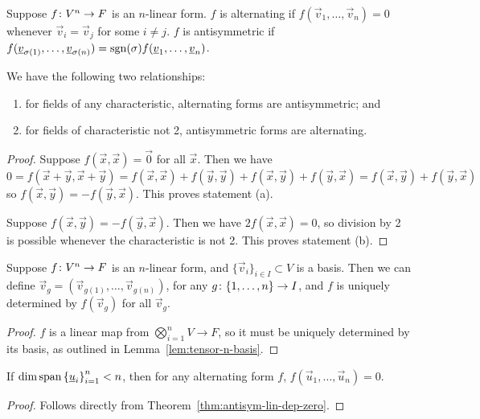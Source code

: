 \begin{definition}
    Suppose \(f\colon V^n\to F\) is an \(n\)-linear form.
    \(f\) is alternating if \(f(\vec{v}_1,\hdots,\vec{v}_n) = 0\)
    whenever \(\vec{v}_i = \vec{v}_j\) for some \(i \neq j\).
    \(f\) is antisymmetric if
    \(f(\underline{v}_{\sigma(1)},\hdots,\underline{v}_{\sigma(n)}) = \operatorname{sgn}(\sigma)f(\underline{v}_1,\hdots,\underline{v}_n)\).
\end{definition}
\begin{proposition}
    We have the following two relationships:
    \begin{enumerate}[label={(\alph*)}, itemsep=0mm]
        \item for fields of any characteristic, alternating forms are antisymmetric; and
        \item for fields of characteristic not 2, antisymmetric forms are alternating.
    \end{enumerate}
\end{proposition}
\begin{proof}
    Suppose \(f(\vec{x},\vec{x}) = \vec{0}\) for all \(\vec{x}\).
    Then we have
    \begin{equation*}
        0 = f(\vec{x}+\vec{y},\vec{x}+\vec{y})
        = f(\vec{x},\vec{x}) + f(\vec{y},\vec{y}) + f(\vec{x},\vec{y}) + f(\vec{y},\vec{x})
        = f(\vec{x},\vec{y}) + f(\vec{y},\vec{x})
    \end{equation*}
    so \(f(\vec{x},\vec{y}) = -f(\vec{y},\vec{x})\).
    This proves statement (a).

    Suppose \(f(\vec{x},\vec{y}) = -f(\vec{y},\vec{x})\).
    Then we have \(2f(\vec{x},\vec{x}) = 0\),
    so division by 2 is possible whenever the characteristic is not 2.
    This proves statement (b).
\end{proof}
\begin{lemma}
    Suppose \(f\colon V^n\to F\) is an \(n\)-linear form,
    and \({\{\vec{v}_i\}}_{i \in I} \subset V\) is a basis.
    Then we can define \(\vec{v}_g = (\vec{v}_{g(1)},\hdots,\vec{v}_{g(n)})\),
    for any \(g\colon\{1,\hdots,n\}\to I\),
    and \(f\) is uniquely determined by \(f(\vec{v}_g)\) for all \(\vec{v}_g\).
\end{lemma}
\begin{proof}
    \(f\) is a linear map from \(\bigotimes_{i=1}^n V \to F\),
    so it must be uniquely determined by its basis,
    as outlined in Lemma~\ref{lem:tensor-n-basis}.
\end{proof}
\begin{corollary}
    If \(\dim\operatorname{span}{\{\underline{u}_i\}}_{i=1}^n < n\),
    then for any alternating form \(f\),
    \(f(\vec{u}_1,\hdots,\vec{u}_n) = 0\).
\end{corollary}
\begin{proof}
    Follows directly from Theorem~\ref{thm:antisym-lin-dep-zero}.
\end{proof}

